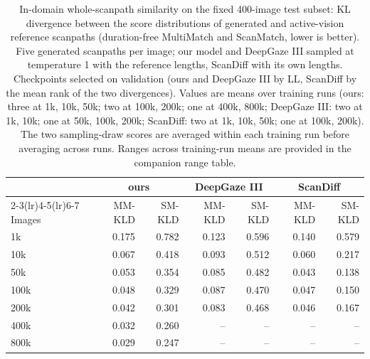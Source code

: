 \begin{table}[t]
  \centering
  \small
  \begin{tabular}{lrrrrrr}
    \toprule
    & \multicolumn{2}{c}{ours} & \multicolumn{2}{c}{DeepGaze III} & \multicolumn{2}{c}{ScanDiff} \\
    \cmidrule(lr){2-3}\cmidrule(lr){4-5}\cmidrule(lr){6-7}
    Images & MM-KLD & SM-KLD & MM-KLD & SM-KLD & MM-KLD & SM-KLD \\
    \midrule
    1k & 0.175 & 0.782 & 0.123 & 0.596 & 0.140 & 0.579 \\
    10k & 0.067 & 0.418 & 0.093 & 0.512 & 0.060 & 0.217 \\
    50k & 0.053 & 0.354 & 0.085 & 0.482 & 0.043 & 0.138 \\
    100k & 0.048 & 0.329 & 0.087 & 0.470 & 0.047 & 0.150 \\
    200k & 0.042 & 0.301 & 0.083 & 0.468 & 0.046 & 0.167 \\
    400k & 0.032 & 0.260 & -- & -- & -- & -- \\
    800k & 0.029 & 0.247 & -- & -- & -- & -- \\
    \bottomrule
  \end{tabular}
  \caption{In-domain whole-scanpath similarity on the fixed 400-image test subset: KL divergence between the score distributions of generated and active-vision reference scanpaths (duration-free MultiMatch and ScanMatch, lower is better). Five generated scanpaths per image; our model and DeepGaze III sampled at temperature 1 with the reference lengths, ScanDiff with its own lengths. Checkpoints selected on validation (ours and DeepGaze III by LL, ScanDiff by the mean rank of the two divergences). Values are means over training runs (ours: three at 1k, 10k, 50k; two at 100k, 200k; one at 400k, 800k; DeepGaze III: two at 1k, 10k; one at 50k, 100k, 200k; ScanDiff: two at 1k, 10k, 50k; one at 100k, 200k). The two sampling-draw scores are averaged within each training run before averaging across runs. Ranges across training-run means are provided in the companion range table.}
  \label{tab:realism}
\end{table}


